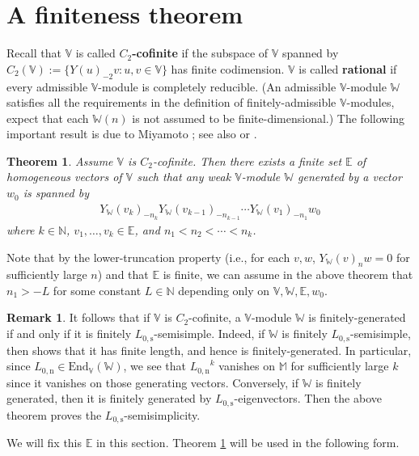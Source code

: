 \documentclass[12pt,a4paper,notitlepage]{article}
\theoremstyle{definition}
\newtheorem{rem}[df]{Remark}
\theoremstyle{plain}
\newtheorem{thm}[df]{Theorem}
\newcommand{\End}{\mathrm{End}} %
\newcommand{\Vbb}{\mathbb V}
\newcommand{\Wbb}{\mathbb W}
\newcommand{\Mbb}{\mathbb M}
\newcommand{\Nbb}{\mathbb N}
\newcommand{\Ebb}{\mathbb E}
\newcommand{\Lss}{{L_{0,\mathrm{s}}}}
\newcommand{\Lni}{{L_{0,\mathrm{n}}}}
\numberwithin{equation}{section}
\begin{document}
\section{A finiteness theorem}


Recall that $\Vbb$ is called \textbf{$C_2$-cofinite} if the subspace of $\Vbb$ spanned by $C_2(\Vbb):=\{Y(u)_{-2}v:u,v\in\Vbb \}$  has finite codimension. $\Vbb$ is called \textbf{rational} if every admissible $\Vbb$-module is completely reducible. (An admissible $\Vbb$-module $\Wbb$ satisfies all the requirements in the definition of finitely-admissible $\Vbb$-modules, expect that each $\Wbb(n)$ is not assumed to be finite-dimensional.) The following important result is due to Miyamoto \cite[Lemma 2.4]{Miy04}; see also \cite{GN03} or \cite[Thm. 1]{Buhl02}.

\begin{thm}\label{lb19}
Assume $\Vbb$ is $C_2$-cofinite. Then there exists a finite set $\Ebb$ of homogeneous vectors of $\Vbb$   such that any weak $\Vbb$-module $\Wbb$ generated by a vector $w_0$ is spanned by
	\begin{align}
	Y_\Wbb(v_k)_{-n_k}Y_\Wbb(v_{k-1})_{-n_{k-1}}\cdots Y_\Wbb(v_1)_{-n_1} w_0\label{eq39}
	\end{align}
where $k\in\Nbb$, $v_1,\dots,v_k\in\Ebb$, and $n_1<n_2<\cdots<n_k$.
\end{thm}

Note that by the lower-truncation property (i.e., for each $v,w$, $Y_\Wbb(v)_nw=0$ for sufficiently large $n$) and that $\Ebb$ is finite, we can assume in the above theorem that $n_1>-L$ for some constant $L\in\Nbb$ depending only on $\Vbb,\Wbb,\Ebb,w_0$. 

\begin{rem}\label{lb61}
It follows that if $\Vbb$ is $C_2$-cofinite, a $\Vbb$-module $\Wbb$ is finitely-generated if and only if it is finitely $\Lss$-semisimple. Indeed, if $\Wbb$ is finitely $\Lss$-semisimple, then \cite[Cor. 3.16]{Hua09} shows that it has finite length, and hence is finitely-generated. In particular, since $\Lni\in\End_\Vbb(\Wbb)$, we see that $\Lni^k$ vanishes on $\Mbb$ for sufficiently large $k$ since it vanishes on those generating vectors. Conversely, if $\Wbb$ is finitely generated, then it is finitely generated by $\Lss$-eigenvectors. Then the above theorem proves the $\Lss$-semisimplicity.
\end{rem}


We will fix this $\Ebb$ in this section.  Theorem \ref{lb19} will be used in the following form.
\end{document}
